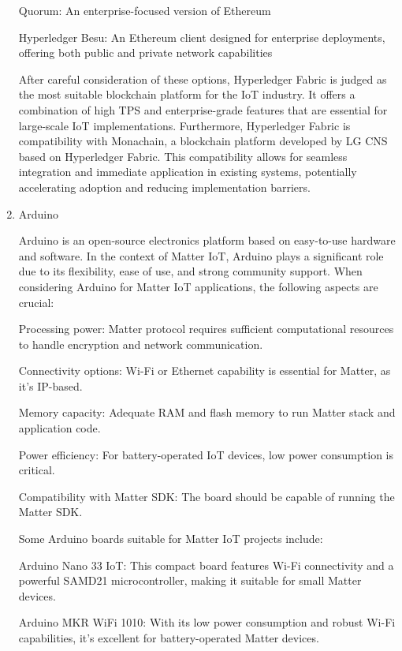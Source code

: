 \documentclass[conference]{IEEEtran}
\begin{document}
\begin{enumerate}[itemsep=2ex, parsep=1ex]
	      Quorum: An enterprise-focused version of Ethereum
	           
	      Hyperledger  Besu: An Ethereum client designed for enterprise deployments, offering both public and private network capabilities
	           
	      After careful consideration of these options, Hyperledger Fabric is judged as the most suitable blockchain platform for the IoT industry. It offers a combination of high TPS and enterprise-grade features that are essential for large-scale IoT implementations.
	      Furthermore, Hyperledger Fabric is compatibility with Monachain, a blockchain platform developed by LG CNS based on Hyperledger Fabric. This compatibility allows for seamless integration and immediate application in existing systems, potentially accelerating adoption and reducing implementation barriers.
	      
	\item Arduino
	      
	      Arduino is an open-source electronics platform based on easy-to-use hardware and software. In the context of Matter IoT, Arduino plays a significant role due to its flexibility, ease of use, and strong community support. When considering Arduino for Matter IoT applications, the following aspects are crucial:
	          
	      Processing power: Matter protocol requires sufficient computational resources to handle encryption and network communication.
	          
	      Connectivity options: Wi-Fi or Ethernet capability is essential for Matter, as it's IP-based.
	          
	      Memory capacity: Adequate RAM and flash memory to run Matter stack and application code.
	          
	      Power efficiency: For battery-operated IoT devices, low power consumption is critical.
	          
	      Compatibility with Matter SDK: The board should be capable of running the Matter SDK.
	          
	      Some Arduino boards suitable for Matter IoT projects include:
	          
	      Arduino Nano 33 IoT: This compact board features Wi-Fi connectivity and a powerful SAMD21 microcontroller, making it suitable for small Matter devices.
	          
	      Arduino MKR WiFi 1010: With its low power consumption and robust Wi-Fi capabilities, it's excellent for battery-operated Matter devices.
	          

\end{enumerate}
\end{document}
